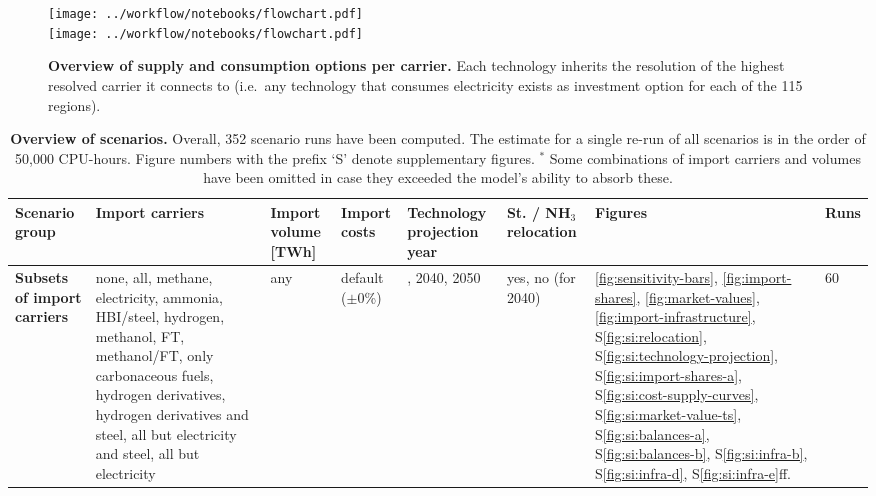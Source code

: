 \begin{figure}[!htb]
    \texttt{[image: ../workflow/notebooks/flowchart.pdf]} \\
    \texttt{[image: ../workflow/notebooks/flowchart.pdf]}
    \caption{\textbf{Overview of supply and consumption options per carrier.}
    Each technology inherits the resolution of the highest resolved carrier it
    connects to (i.e.~any technology that consumes electricity exists as
    investment option for each of the 115 regions).}
    \label{fig:si:supply-consumption-options}
\end{figure}

\begin{table}[!htb]
    \footnotesize
    \setlength{\extrarowheight}{4pt}
    \caption{\textbf{Overview of scenarios.} Overall, 352 scenario runs have
    been computed. The estimate for a single re-run of all scenarios is in the
    order of 50,000 CPU-hours. Figure numbers with the prefix `S' denote
    supplementary figures. $^*$ Some combinations of import carriers and volumes
    have been omitted in case they exceeded the model's ability to absorb
    these.}
    \label{tab:scenarios}
    \begin{tabular}{>{\raggedright\arraybackslash}p{3cm}>{\raggedright\arraybackslash}p{4cm}>{\raggedright\arraybackslash}p{1.8cm}>{\raggedright\arraybackslash}p{2cm}>{\raggedright\arraybackslash}p{1.5cm}>{\raggedright\arraybackslash}p{1.3cm}>{\raggedright\arraybackslash}p{1cm}p{0.5cm}}
    \toprule
    Scenario group & Import carriers & Import volume [TWh] & Import costs & Technology projection year & St. / NH$_3$ relocation & Figures & Runs \\
    \midrule
    \textbf{Subsets of import carriers} & none, all, methane, electricity, ammonia, HBI/steel, hydrogen, methanol, FT, methanol/FT, only carbonaceous fuels, hydrogen derivatives, hydrogen derivatives and steel, all but electricity and steel, all but electricity & any & default ($\pm$0\%) & 2030, 2040, 2050 & yes, no (for 2040) & \ref{fig:sensitivity-bars}, \ref{fig:import-shares}, \ref{fig:market-values}, \ref{fig:import-infrastructure}, S\ref{fig:si:relocation}, S\ref{fig:si:technology-projection}, S\ref{fig:si:import-shares-a}, S\ref{fig:si:cost-supply-curves}, S\ref{fig:si:market-value-ts}, S\ref{fig:si:balances-a}, S\ref{fig:si:balances-b}, S\ref{fig:si:infra-b}, S\ref{fig:si:infra-d}, S\ref{fig:si:infra-e}ff. & 60 \\

\end{tabular}
\end{table}
